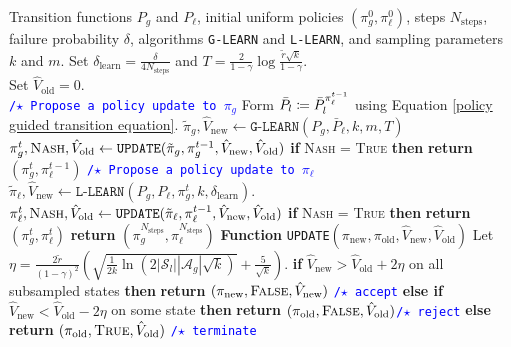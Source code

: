 \begin{algorithm}[t]
\begin{algorithmic}
\caption{\texttt{ALTERNATING-MARL}} 
\REQUIRE Transition functions $P_g$ and $P_\ell$, initial uniform policies $(\pi_g^0,\pi_\ell^0)$, steps $N_{\text{steps}}$,   failure probability $\delta$, algorithms \texttt{G-LEARN} and \texttt{L-LEARN}, and sampling parameters $k$ and $m$.
\smallskip
\STATE Set $\delta_{\text{learn}} = \frac{\delta}{4N_{\text{steps}}}$ and $T=\frac{2}{1-\gamma}\log\frac{\tilde{r}\sqrt{k}}{1-\gamma}$.\\
\STATE Set $\hat{V}_{\text{old}} = 0$.\\
\smallskip
{}
\smallskip
\STATE \textcolor{blue}{\texttt{/$\star$ Propose a policy update to $\pi_g$}}\smallskip
\STATE Form  $\bar{P}_l\coloneqq \smash{\bar{P}_l^{\pi_\ell^{t-1}}}$ using Equation \ref{policy guided transition equation}.
\STATE $ \tilde\pi_g, \hat{V}_{\text{new}} \leftarrow \texttt{G-LEARN}
(P_g,\bar{P}_\ell,k,m,T)$ 
\STATE $\smash{\pi_g^t, \textsc{Nash}, \hat{V}_{\text{old}}} \gets 
\texttt{UPDATE}(\tilde{\pi}_g, \pi_g^{t-1}, \hat{V}_{\text{new}}, \hat{V}_{\text{old}})$
\STATE \textbf{if} \textsc{Nash} = \textsc{True} \textbf{then}
\STATE \quad \textbf{return} $(\pi_g^t, \pi_\ell^{t-1})$
\smallskip
\STATE \textcolor{blue}{\texttt{/$\star$ Propose a policy update to $\pi_\ell$}}
  \STATE $\tilde\pi_\ell, \hat{V}_{\text{new}} \leftarrow \texttt{L-LEARN}(P_g,P_\ell,\pi_g^t,k, \delta_{\text{learn}})$.
  \STATE $\pi_\ell^t, \textsc{Nash}, \hat{V}_{\text{old}} \gets \texttt{UPDATE}(\tilde{\pi}_\ell, \pi_\ell^{t-1},  \hat{V}_{\text{new}}, \hat{V}_{\text{old}})$
  \STATE \textbf{if} \textsc{Nash} = \textsc{True} \textbf{ then }
  \STATE \quad\quad \textbf{return} $(\pi^t_g, \pi^t_\ell)$
  \ENDFOR
\STATE \textbf{return} $(\pi_g^{N_{\text{steps}}},\pi_\ell^{N_{\text{steps}}})$
\smallskip
\STATE \textbf{Function} \texttt{UPDATE}$(\pi_{\text{new}}, \pi_{\text{old}}, \hat{V}_{\text{new}}, \hat{V}_{\text{old}})$
\STATE \quad Let ${\eta = \frac{2\tilde{r}}{(1-\gamma)^2}\left(\sqrt{\frac{1}{2k} \ln(2|\mathcal{S}_l||\mathcal{A}_g|\sqrt{k})} + \frac{5}{\sqrt{k}}\right)}$.
\STATE \quad \textbf{if} {$\hat{V}_{\text{new}} > \hat{V}_{\text{old}} + 2\eta$} on all subsampled states \textbf{then}
\STATE \quad\quad \textbf{return} $(\pi_{\text{new}}, \textsc{False}, \hat{V}_{\text{new}})$  \textcolor{blue}{\texttt{/$\star$ accept}}
\STATE \quad \textbf{else if} {$\hat{V}_{\text{new}} < \hat{V}_{\text{old}} - 2\eta$} on some state \textbf{ then }
\STATE \quad\quad \textbf{return} $(\pi_{\text{old}}, \textsc{False}, \hat{V}_\text{old})$\quad  \textcolor{blue}{\texttt{/$\star$ reject}}
\STATE \quad \textbf{else  }  
\STATE\quad\quad  \textbf{return} $(\pi_{\text{old}}, \textsc{True}, \hat{V}_\text{old})$  \textcolor{blue}{\texttt{/$\star$ terminate}}
\label{algorithm: alternating marl}
\end{algorithmic}
\end{algorithm} 
    
